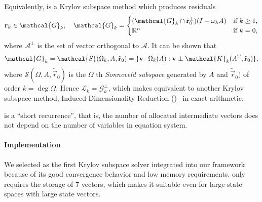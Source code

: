 Equivalently,  is a Krylov subspace method which
produces residuals
\begin{equation}
  \label{eq:algorithms:bicgstab:sonneveld}
  \vec{r}_k \in \mathcal{G}_k, \quad
  \mathcal{G}_k = \begin{cases}
    (\mathcal{G}_{k} \cap \tilde{\vec{r}}_0^{\perp}) (I - \omega_k
    A) & \text{if $k \ge 1$}, \\
    \RR^n & \text{if $k = 0$,}
  \end{cases}
\end{equation}
where $\mathcal{A}^{\perp}$ is the set of vector orthogonal to
$\mathcal{A}$. It can be shown that%
~\citep{sleijpen2010exploiting}
\begin{equation}
  \mathcal{G}_k = \mathcal{S}(\Omega_k, A, \tilde{\vec{r}}_0) = \{
  \vec{v} \cdot \Omega_k(A) : \vec{v} \perp \mathcal{K}_k(A^\T,
  \tilde{\vec{r}}_0) \} \text,
\end{equation}
where $\mathcal{S}(\Omega, A, \tilde{\vec{r}}_0)$ is the
$\Omega$\kern0.5pt th \emph{Sonneveld subspace} generated by $A$ and
$\tilde{\vec{r}}_0)$ of order $k = \deg \Omega$. Hence
$\mathcal{L}_k = \mathcal{G}_k^{\perp}$, which makes 
equivalent to another Krylov subspace method, Induced Dimensionality
Reduction ()~\citep{sleijpen2010exploiting} in exact
arithmetic.

 is a ``short recurrence'', that is, the number of
allocated intermediate vectors does not depend on the number of
variables in equation system.

\paragraph{Implementation}

We selected  as the first Krylov subspace solver
integrated into our framework because of its good convergence
behavior and low memory requirements.  only requires
the storage of 7 vectors, which makes it suitable even for large state
spaces with large state vectors.

